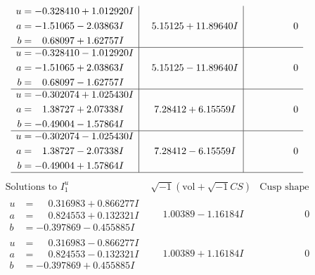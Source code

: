 \documentclass[1p]{elsarticle_modified}
\theoremstyle{definition}
\newcommand{\I}{\sqrt{-1}}
\begin{document}
$$\begin{array}{c|c|c}
\begin{aligned}
u &= -0.328410 + 1.012920 I \\
a &= -1.51065 - 2.03863 I \\
b &= \phantom{-}0.68097 + 1.62757 I\end{aligned}
 & \phantom{-}5.15125 + 11.89640 I & \phantom{-0.000000 } 0 \\ \hline\begin{aligned}
u &= -0.328410 - 1.012920 I \\
a &= -1.51065 + 2.03863 I \\
b &= \phantom{-}0.68097 - 1.62757 I\end{aligned}
 & \phantom{-}5.15125 - 11.89640 I & \phantom{-0.000000 } 0 \\ \hline\begin{aligned}
u &= -0.302074 + 1.025430 I \\
a &= \phantom{-}1.38727 + 2.07338 I \\
b &= -0.49004 - 1.57864 I\end{aligned}
 & \phantom{-}7.28412 + 6.15559 I & \phantom{-0.000000 } 0 \\ \hline\begin{aligned}
u &= -0.302074 - 1.025430 I \\
a &= \phantom{-}1.38727 - 2.07338 I \\
b &= -0.49004 + 1.57864 I\end{aligned}
 & \phantom{-}7.28412 - 6.15559 I & \phantom{-0.000000 } 0\\
 \hline 
 \end{array}$$\newpage$$\begin{array}{c|c|c}  
\text{Solutions to }I^u_{1}& \I (\text{vol} + \sqrt{-1}CS) & \text{Cusp shape}\\
 \hline 
\begin{aligned}
u &= \phantom{-}0.316983 + 0.866277 I \\
a &= \phantom{-}0.824553 + 0.132321 I \\
b &= -0.397869 - 0.455885 I\end{aligned}
 & \phantom{-}1.00389 - 1.16184 I & \phantom{-0.000000 } 0 \\ \hline\begin{aligned}
u &= \phantom{-}0.316983 - 0.866277 I \\
a &= \phantom{-}0.824553 - 0.132321 I \\
b &= -0.397869 + 0.455885 I\end{aligned}
 & \phantom{-}1.00389 + 1.16184 I & \phantom{-0.000000 } 0 \\ \hline\begin{aligned}

\end{aligned}
\end{array}$$
\end{document}
